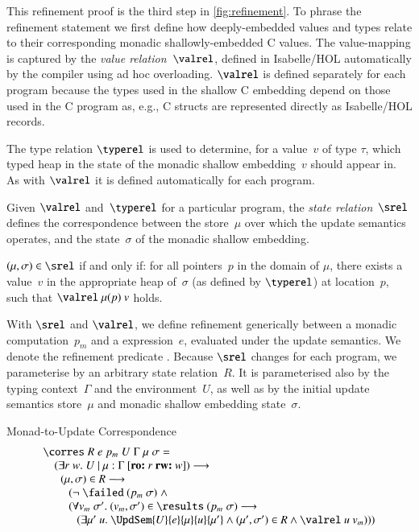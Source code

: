 \documentclass[9pt\ifFinal\else,preprint,nocopyrightspace\fi,\ifAlpha\else natbib,authoryear\fi]{sigplanconf}
\begin{document}
This refinement proof is the third step in \autoref{fig:refinement}.
To phrase the refinement statement we first define how deeply-embedded 
\CDSL values and types relate to their corresponding monadic shallowly-embedded C values.
The value-mapping is captured by
the \emph{value relation}~$\valrel$, defined in Isabelle/HOL automatically
by the
\CDSL compiler using ad hoc
overloading. $\valrel$ is defined separately for each \CDSL program because the
types used in the shallow C embedding depend on those used in
the C program as, e.g., C structs are represented directly as
Isabelle/HOL records. 



The type relation $\typerel$ is used to determine, for a \CDSL value~$v$ of
type $\tau$, which typed heap in the state of the monadic shallow 
embedding~$v$ should appear in. As with $\valrel$ it is defined automatically
for each \CDSL program.

Given $\valrel$ and~$\typerel$ for a particular \CDSL program, the
\emph{state relation}~$\srel$ defines the correspondence between the store~$\mu$
over which the \CDSL update semantics operates, 
and the state~$\sigma$ of the monadic shallow embedding. 

\begin{definition}
$(\mu,\sigma) \in \srel$ if and only if: for all pointers~$p$
in the domain of $\mu$, there exists a
value~$v$ in the appropriate heap of~$\sigma$ (as defined by $\typerel$) at
location~$p$, such that $\valrel\  \mu(p)\  v$ holds.
\end{definition}

\noindent 
With $\srel$ and $\valrel$,
we define refinement generically between 
a monadic computation~$p_m$
and a \CDSL expression~$e$, evaluated under the update semantics. 
We denote the 
refinement predicate \corres.
Because $\srel$ changes for each \CDSL program, we parameterise
\corres by an arbitrary state relation~$R$. It is parameterised also by 
the typing context~$\Gamma$ and the environment~$U$, 
as well as by the initial update semantics store~$\mu$ and monadic shallow embedding
state~$\sigma$.

\begin{definition}{Monad-to-Update Correspondence}
\[
\begin{array}{l}
\corres \;R\; e\; p_m\;U\; \Gamma\; \mu\; \sigma = \\
\quad (\exists r \; w.\; U\ |\ \mu : \Gamma\ [\textbf{ro:}\ r\ \textbf{rw:}\ w])\longrightarrow \\
\quad \;\;     (\mu,\sigma) \in R \longrightarrow \\
\quad\quad   \;(\neg\ \failed \ (p_m \ \sigma)\; \wedge \\
\quad\quad   \;(\forall v_m \;\sigma^\prime. \ (v_m,\sigma^\prime) \in \results\ (p_m\;\sigma) \longrightarrow \\
\quad\quad\quad    (\exists \mu^\prime \ u. \ \UpdSem{U}{e}{\mu}{u}{\mu^\prime} \wedge 
      (\mu^\prime,\sigma^\prime) \in R \wedge \valrel\ u\ v_m)))
\end{array}
\]
\end{definition}
\end{document}
